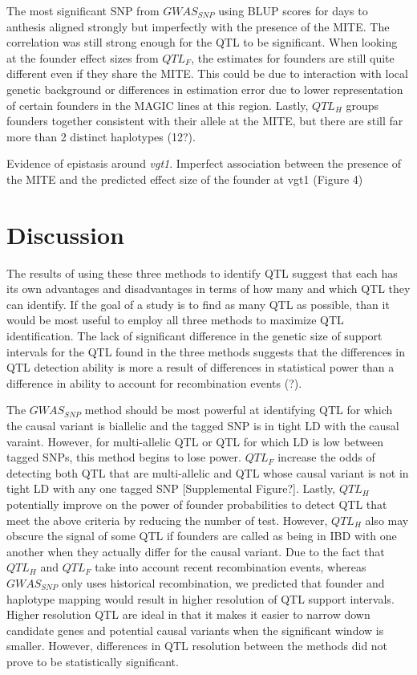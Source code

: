 \documentclass[article,9pt,twocolumn,twoside]{rilabRxiv}
\begin{document}
The most significant SNP from $GWAS_{SNP}$ using BLUP scores for days to anthesis aligned strongly but imperfectly with the presence of the MITE.
The correlation was still strong enough for the QTL to be significant. When looking at the founder effect sizes from $QTL_F$, the estimates for founders are still quite different even if they share the MITE.
This could be due to interaction with local genetic background or differences in estimation error due to lower representation of certain founders in the MAGIC lines at this region.
Lastly, $QTL_H$ groups founders together consistent with their allele at the MITE, but there are still far more than 2 distinct haplotypes (12?).


Evidence of epistasis around \emph{vgt1}.
Imperfect association between the presence of the MITE and the predicted effect size of the founder at vgt1 (Figure 4)




\section{Discussion}
The results of using these three methods to identify QTL suggest that each has its own advantages and disadvantages in terms of how many and which QTL they can identify.
If the goal of a study is to find as many QTL as possible, than it would be most useful to employ all three methods to maximize QTL identification.
The lack of significant difference in the genetic size of support intervals for the QTL found in the three methods suggests that the differences in QTL detection ability is more a result of differences in statistical power than a difference in ability to account for recombination events (?).


The $GWAS_{SNP}$ method should be most powerful at identifying QTL for which the causal variant is biallelic and the tagged SNP is in tight LD with the causal varaint.
However, for multi-allelic QTL or QTL for which LD is low between tagged SNPs, this method begins to lose power.
$QTL_F$ increase the odds of detecting both QTL that are multi-allelic and QTL whose causal variant is not in tight LD with any one tagged SNP [Supplemental Figure?].
Lastly, $QTL_H$ potentially improve on the power of founder probabilities to detect QTL that meet the above criteria by reducing the number of test.
However, $QTL_H$ also may obscure the signal of some QTL if founders are called as being in IBD with one another when they actually differ for the causal variant.
Due to the fact that $QTL_H$ and $QTL_F$ take into account recent recombination events, whereas $GWAS_{SNP}$ only uses historical recombination, we predicted that founder and haplotype mapping would result in higher resolution of QTL support intervals.
Higher resolution QTL are ideal in that it makes it easier to narrow down candidate genes and potential causal variants when the significant window is smaller.
However, differences in QTL resolution between the methods did not prove to be statistically significant.
\end{document}
